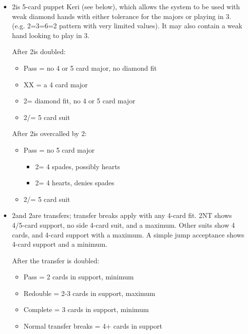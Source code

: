 \documentclass[a4paper,14pt]{extarticle}
\begin{document}
\begin{itemize}

\item 2\clubs is 5-card puppet Keri (see below), which allows the system to be used with weak diamond hands with either tolerance for the majors or playing in 3\diamonds. (e.g. 2=3=6=2 pattern with very limited values). It may also contain a weak hand looking to play in 3\clubs.

\label{note:9}

After 2\clubs is doubled:

	\begin{itemize}
	\item Pass = no 4 or 5 card major, no diamond fit
	\item XX = a 4 card major
	\item 2\diamonds = diamond fit, no 4 or 5 card major
	\item 2\hearts/\spades = 5 card suit
	\end{itemize}

After 2\clubs is overcalled by 2\diamonds:
	
	\begin{itemize}
	\item Pass = no 5 card major
		\begin{itemize}
		\item 2\hearts = 4 spades, possibly hearts
		\item 2\spades = 4 hearts, denies spades
		\end{itemize}
	\item 2\hearts/\spades = 5 card suit
	\end{itemize}

\item 2\diamonds and 2\hearts are transfers; transfer breaks apply with any 4-card fit.  2NT
shows 4/5-card support, no side 4-card suit, and a maximum.  Other suits
show 4 cards, and 4-card support with a maximum.  A simple jump acceptance
shows 4-card support and a minimum.

After the transfer is doubled:

	\begin{itemize}
	\item Pass = 2 cards in support, minimum
	\item Redouble = 2-3 cards in support, maximum
	\item Complete = 3 cards in support, minimum
	\item Normal transfer breaks = 4+ cards in support
	\end{itemize}


\end{itemize}
\end{document}
